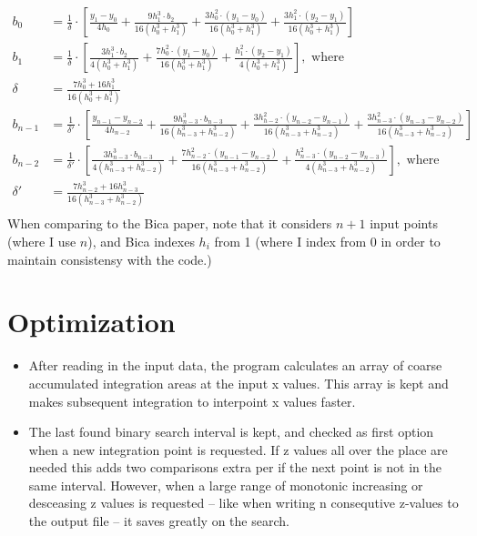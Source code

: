 \documentclass[a4paper]{article}
\begin{document}
\begin{align*}
    b_0 &= \frac{1}{\delta} \cdot \left[ \frac{y_1 - y_0}{4h_0} +
    \frac{9h_1^3\cdot b_2}{16(h_0^3+h_1^3)} +
    \frac{3h_0^2\cdot(y_1-y_0)}{16(h_0^3+h_1^3)} +
    \frac{3h_1^2\cdot(y_2-y_1)}{16(h_0^3+h_1^3)} \right ] \\
    b_1 &= \frac{1}{\delta} \cdot \left[ \frac{3h_1^3\cdot b_2}{4(h_0^3+h_1^3)} +
    \frac{7h_0^2\cdot(y_1-y_0)}{16(h_0^3+h_1^3)} +
    \frac{h_1^2\cdot(y_2-y_1)}{4(h_0^3+h_1^3)} \right], \text{ where}\\
    \delta &= \frac{7h_0^3+16h_1^3}{16(h_0^3+h_1^3)} \\
    b_{n-1} &= \frac{1}{\delta '} \cdot \left[ \frac{y_{n-1} - y_{n-2}}{4h_{n-2}} +
    \frac{9h_{n-3}^3 \cdot b_{n-3}}{16(h_{n-3}^3+h_{n-2}^3)} + 
    \frac{3h_{h-2}^2 \cdot(y_{n-2}-y_{n-1})}{16(h_{n-3}^3+h_{n-2}^3)} +
    \frac{3h_{n-3}^2\cdot(y_{n-3}-y_{n-2})}{16(h_{n-3}^3+h_{n-2}^3)} \right ] \\
    b_{n-2} &= \frac{1}{\delta '} \cdot \left[ \frac{3 h_{n-3}^3\cdot b_{n-3}}{4(h_{n-3}^3+h_{n-2}^3)} +
    \frac{7h_{n-2}^2\cdot (y_{n-1}-y_{n-2})}{16(h_{n-3}^3+h_{n-2}^3)} +
    \frac{h_{n-3}^2 \cdot (y_{n-2}-y_{n-3})}{4(h_{n-3}^3+h_{n-2}^3)}  \right], \text{ where} \\
    \delta ' &= \frac{7h_{n-2}^3+16h_{n-3}^3}{16(h_{n-3}^3+h_{n-2}^3)} \\
\end{align*}
When comparing to the Bica paper, note that it considers $n+1$ input points (where I use $n$), and Bica indexes $h_i$ from 1 (where I index from 0 in order to maintain consistensy with the code.)

\section{Optimization}
\begin{itemize}
    \item After reading in the input data, the program calculates an array of coarse accumulated integration areas at the input x values. This array is kept and makes subsequent integration to interpoint x values faster.
    
    \item The last found binary search interval is kept, and checked as first option when a new integration point is requested. If z values all over the place are needed this adds two comparisons extra per if the next point is not in the same interval. However, when a large range of monotonic increasing or desceasing z values is requested – like when writing n consequtive z-values to the output file – it saves greatly on the search.
\end{itemize}
\end{document}
